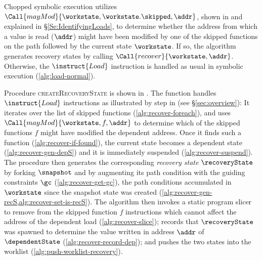 Chopped symbolic execution utilizes
$\Call{mayMod}{\workstate,\workstate.\skipped,\addr}$, shown in
 and explained in
\S\ref{Se:IdentifyingLoads}, to determine whether the address from
which a value is read ($\addr$) might have been modified by one of the
skipped functions on the path followed by the current state
$\workstate$. If so, the algorithm generates recovery states by
calling $\Call{recover}{\workstate,\addr}$.  Otherwise, the
$\instruct{Load}$ instruction is handled as usual in symbolic
execution (\cref{alg:load-normal}).

Procedure \textsc{createRecoveryState} is shown in
. The function handles $\instruct{Load}$
instructions as illustrated by step  in 
(see \S\ref{sec:overview}): It iterates over the list of skipped
functions (\cref{alg:recover-foreach}), and uses
$\Call{mayMod}{\workstate, f,\addr}$ to determine which of the skipped
functions $f$ might have modified the dependent address. Once it finds
such a function (\cref{alg:recover-if-found}), the current state
becomes a dependent state (\cref{alg:recover-gen-depS}) and it is
immediately suspended (\cref{alg:recover-suspend}). The procedure then
generates the corresponding \emph{recovery state} $\recoveryState$ by
forking $\snapshot$ and by augmenting its path condition with the
guiding constraints $\gc$ (\cref{alg:recover-get-gc}), \ie the path
conditions accumulated in $\workstate$ since the snapshot state was
created (\cref{alg:recover-gen-recS,alg:recover-set-is-recS}). The
algorithm then invokes a static program slicer to remove from the
skipped function $f$ instructions which cannot affect the address of
the dependent load (\cref{alg:recover-slice}); records that
$\recoveryState$ was spawned to determine the value written in address
$\addr$ of $\dependentState$ (\cref{alg:recover-record-dep}); and
pushes the two states into the worklist
(\cref{alg:push-worklist-recovery}).

\subsection{}

